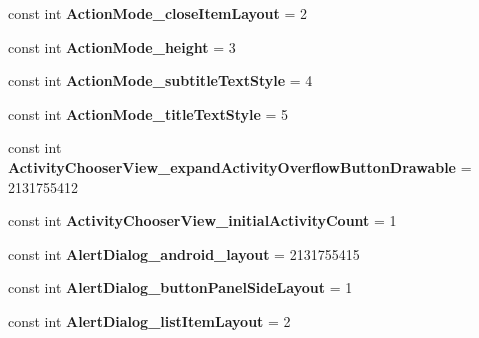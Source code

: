 \begin{DoxyCompactItemize}
const int {\bfseries Action\+Mode\+\_\+close\+Item\+Layout} = 2
\item 
\mbox{\label{classst_delivery_1_1_resource_1_1_styleable_a3a3f60ed7eda7b396c439ad3f732e010}} 
const int {\bfseries Action\+Mode\+\_\+height} = 3
\item 
\mbox{\label{classst_delivery_1_1_resource_1_1_styleable_a4300c3835d0b316486eb738fa02c5d61}} 
const int {\bfseries Action\+Mode\+\_\+subtitle\+Text\+Style} = 4
\item 
\mbox{\label{classst_delivery_1_1_resource_1_1_styleable_aeb4f3d1ea8a5ec1b4d0df498b7dbf9af}} 
const int {\bfseries Action\+Mode\+\_\+title\+Text\+Style} = 5
\item 
\mbox{\label{classst_delivery_1_1_resource_1_1_styleable_a545facfe71210b535e687a45191be1cf}} 
const int {\bfseries Activity\+Chooser\+View\+\_\+expand\+Activity\+Overflow\+Button\+Drawable} = 2131755412
\item 
\mbox{\label{classst_delivery_1_1_resource_1_1_styleable_a5a08514415f51e7fccb68339802e2efb}} 
const int {\bfseries Activity\+Chooser\+View\+\_\+initial\+Activity\+Count} = 1
\item 
\mbox{\label{classst_delivery_1_1_resource_1_1_styleable_a8d3b08b3192bef641ad74c763c13f72c}} 
const int {\bfseries Alert\+Dialog\+\_\+android\+\_\+layout} = 2131755415
\item 
\mbox{\label{classst_delivery_1_1_resource_1_1_styleable_a6eb9b998d0d4d8195677c97540586d30}} 
const int {\bfseries Alert\+Dialog\+\_\+button\+Panel\+Side\+Layout} = 1
\item 
\mbox{\label{classst_delivery_1_1_resource_1_1_styleable_aebbe2594f2093b90b163d8e5b412db96}} 
const int {\bfseries Alert\+Dialog\+\_\+list\+Item\+Layout} = 2
\item 
\mbox{\label{classst_delivery_1_1_resource_1_1_styleable_aa3b99d29735bbd6b8db8d19f1aa9a838}} 

\end{DoxyCompactItemize}
